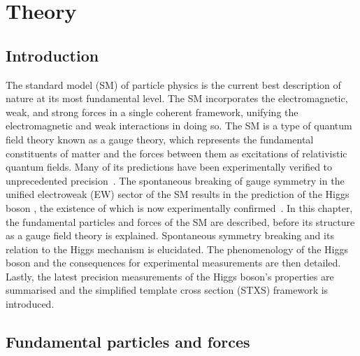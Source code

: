 \chapter{Theory}
\label{chap:theory}


\section{Introduction}

The standard model (SM) of particle physics is the current best description of nature 
at its most fundamental level.
The SM incorporates the electromagnetic, weak, 
and strong forces in a single coherent framework, 
unifying the electromagnetic and weak interactions in doing so.
The SM is a type of quantum field theory known as a gauge theory, 
which represents the fundamental constituents of matter and the forces between them
as excitations of relativistic quantum fields.
Many of its predictions have been experimentally verified to unprecedented precision~\cite{PrecisionQED}.
The spontaneous breaking of gauge symmetry in the unified electroweak (EW) sector of the SM
results in the prediction of the Higgs boson \cite{HiggsPaper,BroutEnglert,KibbleEtc}, 
the existence of which is now experimentally confirmed~\cite{ATLASdiscovery,CMSdiscovery}.
In this chapter, the fundamental particles and forces of the SM are described, 
before its structure as a gauge field theory is explained.
Spontaneous symmetry breaking and its relation to the Higgs mechanism is elucidated.
The phenomenology of the Higgs boson and the consequences for experimental measurements 
are then detailed. 
Lastly, the latest precision measurements of the Higgs boson's properties are summarised 
and the simplified template cross section (STXS) framework is introduced.

\section{Fundamental particles and forces}

